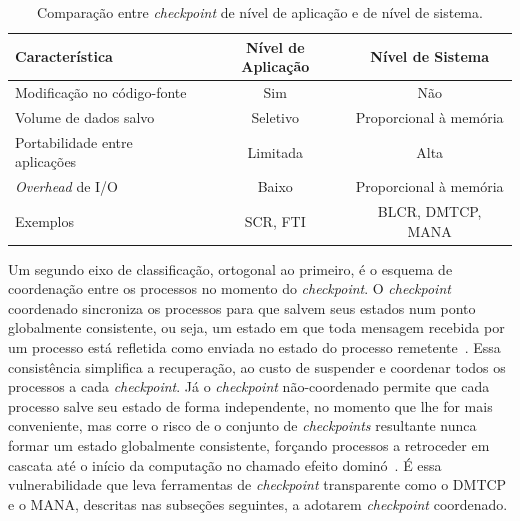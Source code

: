 \begin{table}[htb]
  \centering
  \caption{Comparação entre \textit{checkpoint} de nível de aplicação e de nível de sistema.}
  \label{tab:ckpt-comparacao}
  \begin{tabular}{lcc}
    \toprule
    \textbf{Característica} & \textbf{Nível de Aplicação} & \textbf{Nível de Sistema} \\
    \midrule
    Modificação no código-fonte  & Sim         & Não \\
    Volume de dados salvo        & Seletivo    & Proporcional à memória \\
    Portabilidade entre aplicações & Limitada  & Alta \\
    \textit{Overhead} de I/O & Baixo       & Proporcional à memória \\
    Exemplos                     & SCR, FTI   & BLCR, DMTCP, MANA \\
    \bottomrule
  \end{tabular}
\end{table}

Um segundo eixo de classificação, ortogonal ao primeiro, é o esquema de coordenação
entre os processos no momento do \textit{checkpoint}. O \textit{checkpoint} coordenado sincroniza os
processos para que salvem seus estados num ponto globalmente consistente, ou seja, um
estado em que toda mensagem recebida por um processo está refletida como enviada no
estado do processo remetente~\cite{elnozahy2002survey}. Essa consistência simplifica a
recuperação, ao custo de suspender e coordenar todos os processos a cada \textit{checkpoint}. Já
o \textit{checkpoint} não-coordenado permite que cada processo salve seu estado de forma
independente, no momento que lhe for mais conveniente, mas corre o risco de o conjunto
de \textit{checkpoints} resultante nunca formar um estado globalmente consistente, forçando
processos a retroceder em cascata até o início da computação no chamado efeito
dominó~\cite{elnozahy2002survey}. É essa vulnerabilidade que leva ferramentas de
\textit{checkpoint} transparente como o DMTCP e o MANA, descritas nas subseções seguintes, a
adotarem \textit{checkpoint} coordenado.

